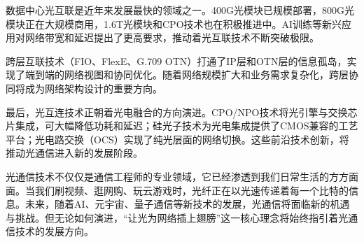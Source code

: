 数据中心光互联是近年来发展最快的领域之一。400G光模块已规模部署，800G光模块正在大规模商用，1.6T光模块和CPO技术也在积极推进中。AI训练等新兴应用对网络带宽和延迟提出了更高要求，推动着光互联技术不断突破极限。

跨层互联技术（FIO、FlexE、G.709 OTN）打通了IP层和OTN层的信息孤岛，实现了端到端的网络视图和协同优化。随着网络规模扩大和业务需求复杂化，跨层协同将成为网络架构设计的重要方向。

最后，光互连技术正朝着光电融合的方向演进。CPO/NPO技术将光引擎与交换芯片集成，可大幅降低功耗和延迟；硅光子技术为光电集成提供了CMOS兼容的工艺平台；光电路交换（OCS）实现了纯光层面的网络切换。这些前沿技术创新，将推动光通信进入新的发展阶段。

光通信技术不仅仅是通信工程师的专业领域，它已经渗透到我们日常生活的方方面面。当我们刷视频、逛网购、玩云游戏时，光纤正在以光速传递着每一个比特的信息。未来，随着AI、元宇宙、量子通信等新技术的发展，光通信将面临新的机遇与挑战。但无论如何演进，“让光为网络插上翅膀”这一核心理念将始终指引着光通信技术的发展方向。
